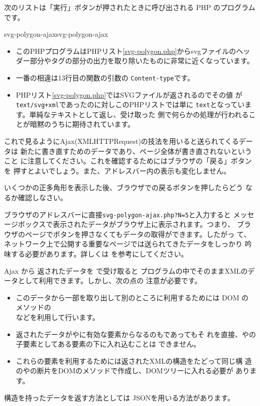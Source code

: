 次のリストは「実行」ボタンが押されたときに呼び出される PHP のプログラム
です。%

    {svg-polygon-ajax}{svg-polygon-ajax}
\begin{itemize}
 \item このPHPプログラムはPHPリスト\ref{svg-polygon.php}からsvgファイルのヘッ
ダー部分やタグの部分の出力を取り除いたものに非常に近くなっています。
 \item 一番の相違は13行目の関数の引数の
       \texttt{Content-type}です。
 \item PHPリスト\ref{svg-polygon.php}ではSVGファイルが返されるのでその値
       が\texttt{text/svg+xml}であったのに対しこのPHPリストでは単に
       \texttt{text}となっています。単純なテキストとして返し、受け取った
       側で何らかの処理が行われることが暗黙のうちに期待されています。
\end{itemize}

これで見るようにAjax(XMLHTTPRequest)の技法を用いると送られてくるデータは
  新たに書き直すためのデータであり、ページ全体が書き直されないということ
  に注意してください。これを確認するためにはブラウザの「戻る」ボタンを
  押すとよいでしょう。また、アドレスバー内の表示も変化しません。
\begin{Problem}\upshape
 いくつかの正多角形を表示した後、ブラウザでの戻るボタンを押したらどう
 なるか確認しなさい。

\iffalse
同様のことを \keyitem{Google Map}でも行いなさい。特に、検索をした後どう
 なるかを調べなさい。
\fi
\end{Problem}
ブラウザのアドレスバーに直接\verb+svg-polygon-ajax.php?N=5+と入力すると
メッセージボックスで表示されたデータがブラウザ上に表示されます。つまり、
ブラウザのページでボタンを押さなくてもデータの取得ができます。したがっ
て、ネットワーク上で公開する重要なページでは送られてきたデータをしっかり
吟味する必要があります。詳しくは\cite{PHPSecurity}%
を参考にしてください。

Ajax から 返されたデータを  で受け取ると
プログラムの中でそのままXMLのデータとして利用できます。しかし、次の点の
注意が必要です。
\begin{itemize}
 \item このデータから一部を取り出して別のところに利用するためには DOM の
       メソッドの\\などを利用して行います。
 \item 返されたデータが\SVG や\HTML に有効な要素からなるのもであってもそ
       れを直接、\SVG や\HTML の子要素としてある要素の下に入れ込むことは
       できません。
 \item これらの要素を利用するためには返されたXMLの構造をたどって同じ構
造の\SVG や\HTML の断片をDOMのメソッドで作成し、DOMツリーに入れる必要が
       あります。
\end{itemize}
構造を持ったデータを返す方法としては
JSONを用いる方法があります。
\iffalse
